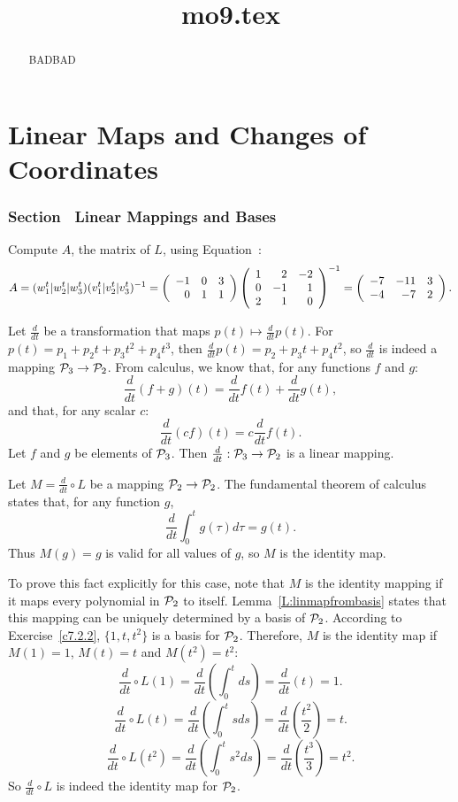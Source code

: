 \documentclass{ximera}
\title{mo9.tex}
\begin{document}
\begin{abstract}
BADBAD
\end{abstract}
\maketitle

\chapter{Linear Maps and Changes of Coordinates}

\subsection*{Section~\protect{\ref{Sect:linmap}} Linear Mappings and Bases}

Compute $A$, the matrix of $L$, using Equation~:
\[ A = (w_1^t|w_2^t|w_3^t)(v_1^t|v_2^t|v_3^t)^{-1} =
\left(\begin{array}{rrr} -1 & 0 & 3 \\ 0 & 1 & 1 \end{array}\right)
\left(\begin{array}{rrr} 1 & 2 & -2 \\ 0 & -1 & 1 \\ 2 & 1 & 0\end{array}\right)^{-1} =
\left(\begin{array}{rrr} -7 & -11 & 3 \\ -4 & -7 & 2
\end{array}\right). \]

Let $\frac{d}{dt}$ be a transformation that maps $p(t) \mapsto
\frac{d}{dt}p(t)$.  For $p(t) =  p_1 + p_2t + p_3t^2 + p_4t^3$, then
$\frac{d}{dt}p(t) = p_2 + p_3t + p_4t^2$, so $\frac{d}{dt}$ is indeed
a mapping ${\cal P}_3 \rightarrow {\cal P}_2$.  From calculus, we
know that, for any functions $f$ and $g$:
\[ \frac{d}{dt}(f + g)(t) = \frac{d}{dt}f(t) + \frac{d}{dt}g(t), \]
and that, for any scalar $c$:
\[ \frac{d}{dt}(cf)(t) = c\frac{d}{dt}f(t). \]
Let $f$ and $g$ be elements of ${\cal P}_3$.  Then
$\frac{d}{dt}: {\cal P}_3 \rightarrow {\cal P}_2$ is a linear mapping.

Let $M = \frac{d}{dt} \circ L$ be a mapping ${\cal P}_2
\rightarrow {\cal P}_2$.  The fundamental
theorem of calculus states that, for any function $g$,
\[ \frac{d}{dt}\int_0^t g(\tau)d\tau = g(t). \]
Thus $M(g) = g$ is valid for all values of $g$, so $M$ is the
identity map.

\para To prove this fact explicitly for this case, note that $M$ is
the identity mapping if it maps every polynomial in ${\cal P}_2$ to
itself.  Lemma~\ref{L:linmapfrombasis} states that this mapping can
be uniquely determined by a basis of ${\cal P}_2$.  According to
Exercise~\ref{c7.2.2}, $\{1,t,t^2\}$ is a basis for ${\cal P}_2$. 
Therefore, $M$ is the identity map if $M(1) = 1$, $M(t) = t$ and
$M(t^2) = t^2$:
\[ \frac{d}{dt} \circ L (1) = \frac{d}{dt}\left(\int_0^tds\right) =
\frac{d}{dt}(t) = 1. \]
\[ \frac{d}{dt} \circ L (t) = \frac{d}{dt}\left(\int_0^tsds\right) =
\frac{d}{dt}\left(\frac{t^2}{2}\right) = t. \]
\[ \frac{d}{dt} \circ L (t^2) = \frac{d}{dt}\left(\int_0^ts^2ds\right) =
\frac{d}{dt}\left(\frac{t^3}{3}\right) = t^2. \]
So $\frac{d}{dt} \circ L$ is indeed the identity map for ${\cal P}_2$.
\end{document}
